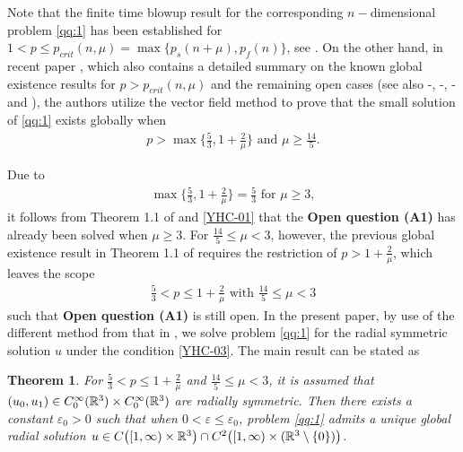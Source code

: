 \documentclass[11pt,twoside]{article}
\newcommand{\ve}{\varepsilon}
\newcommand{\f}{\frac}
\theoremstyle{plain}
\newtheorem{theorem}{Theorem}[section]
\theoremstyle{definition}
\theoremstyle{remark}
\numberwithin{equation}{section}
\begin{document}
\medskip

Note that the finite time blowup result for the corresponding $n-$dimensional problem \eqref{qq:1} has been established for
$1<p\leq p_{crit}(n,\mu)=\max\{p_s(n+\mu),p_f(n)\}$, see
\cite{FLT,IS,LTW,PR-0,PR,TL2,W1}. On the other hand,
in recent paper \cite{LY-2}, which also contains a detailed summary on the known global existence results for
$p>p_{crit}(n,\mu)$ and the remaining open cases (see also \cite{DA-0}-\cite{Rei1}, \cite{HL}-\cite{HLY}, \cite{LZ-1}-\cite{LY}
and \cite{P1}), the authors utilize the vector field method to prove that  the small solution of  \eqref{qq:1} exists globally
when
\begin{equation}\label{YHC-01}
\begin{aligned}
\text{$p>\max\big\{\f{5}{3},1+\f{2}{\mu}\big\}$ and $\mu\geq\f{14}{5}$.}
\end{aligned}
\end{equation}

Due to
\begin{equation}\label{YHC-02}
\begin{aligned}
\text{$\max\big\{\f{5}{3},1+\f{2}{\mu}\big\}=\f{5}{3}$ for $\mu\geq3$},
\end{aligned}
\end{equation}
it follows from Theorem 1.1 of \cite{LY-2} and \eqref{YHC-01}
that the {\bf Open question (A1)} has already been solved when $\mu\geq3$. For
$\f{14}{5}\leq\mu<3$, however, the previous global existence result in Theorem 1.1 of \cite{LY-2} requires
the restriction of $p>1+\f{2}{\mu}$, which leaves the scope
\begin{equation}\label{YHC-03}
\begin{aligned}
\text{$\f{5}{3}<p\leq1+\f{2}{\mu}$ with $\f{14}{5}\leq\mu<3$}
\end{aligned}
\end{equation}
such that {\bf Open question (A1)} is still open.
In the present paper, by use of the different method from
that in \cite{LY-2}, we solve problem  \eqref{qq:1}
for the radial symmetric solution $u$ under the condition \eqref{YHC-03}.
The main result can be  stated as
\begin{theorem}
\label{thm:main}
For $\f{5}{3}<p\leq1+\f{2}{\mu}$ and
$\f{14}{5}\leq\mu<3$, it is assumed that $(u_0,u_1)\in C_0^\infty(\Bbb R^3)\times C_0^\infty(\Bbb R^3)$ are radially symmetric. Then there exists a
constant $\ve_0>0$ such that when $0<\ve\leq\ve_0$, problem
\eqref{qq:1} admits a unique global  radial solution
$u\in C\bigl([1,\infty)\times\Bbb R^3\bigr)\cap
C^2\bigl([1,\infty)\times(\Bbb R^3\setminus\{0\})\bigr)$.
\end{theorem}
\end{document}
